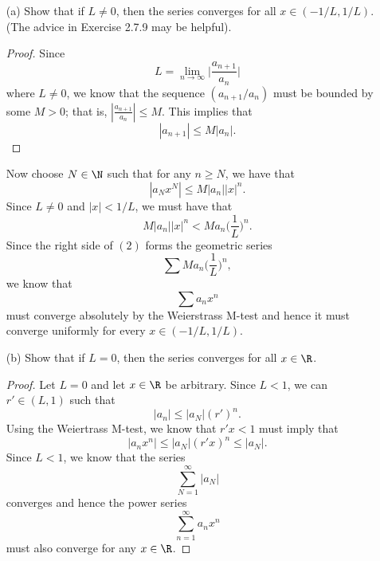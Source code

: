 \begin{enumerate}
    \item[(a)] Show that if \( L \neq 0  \), then the series converges for all \( x \in (- 1/ L, 1 / L ) \). (The advice in Exercise 2.7.9 may be helpful).
        \begin{proof}
        Since 
        \[  L = \lim_{ n \to \infty  } \Big| \frac{ a_{n+1} }{ a_{n} }  \Big|  \]
        where \( L \neq 0  \), we know that the sequence \( (a_{n+1}/ a_{n}) \) must be bounded by some \( M > 0  \); that is, \( | \frac{ a_{n+1} }{ a_n }   | \leq M  \). This implies that 
        \[  | a_{n+1}  |  \leq M | a_n  |. \]
        \end{proof}
        Now choose \( N \in \N  \) such that for any \(  n \geq N  \), we have that 
        \[  | a_N x^{N} | \leq  M | a_n | |x|^{n}. \tag{1}\]
        Since \( L \neq 0  \) and \( | x  |  < 1 / L  \), we must have that 
        \[  M | a_n | |x|^n < M a_n  \Big( \frac{ 1 }{ L  }  \Big)^{n} \tag{2}.  \]
        Since the right side of \( (2) \) forms the geometric series
        \[  \sum M a_n \Big( \frac{ 1 }{ L }  \Big)^n,\] we know that 
        \[  \sum a_n x^n  \] must converge absolutely by the Weierstrass M-test and hence it must converge uniformly for every \( x \in  (-1/L , 1 /L ) \).
    \item[(b)] Show that if \( L = 0  \), then the series converges for all \( x \in \R  \).
        \begin{proof}
        Let \( L = 0  \) and let \( x \in \R  \) be arbitrary. Since \( L < 1  \), we can  \( r' \in (L , 1 ) \) such that 
        \[  | a_n | \leq | a_N | (r')^n.\]
        Using the Weiertrass M-test, we know that \( r'x < 1  \) must imply that 
        \[  | a_n x^n  | \leq | a_N  | (r' x )^n \leq | a_N  | .\]
        Since \( L < 1  \), we know that the series 
        \[  \sum_{ N=1 }^{ \infty  } | a_N |   \] converges and hence the power series 
        \[  \sum_{ n=1  }^{ \infty  } a_n x^n \] must also converge for any \( x \in \R  \).
        

\end{proof}
\end{enumerate}
